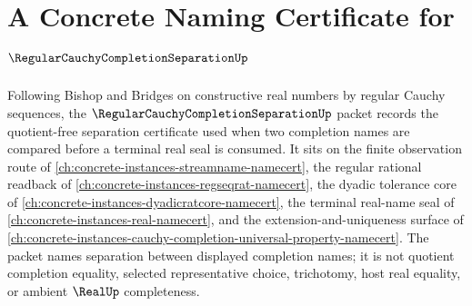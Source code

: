 \chapter{A Concrete Naming Certificate for $\RegularCauchyCompletionSeparationUp$}
\label{ch:concrete-instances-regular-cauchy-completion-separation-namecert}

Following Bishop and Bridges on constructive real numbers by regular Cauchy sequences, the $\RegularCauchyCompletionSeparationUp$ packet records the quotient-free separation certificate used when two completion names are compared before a terminal real seal is consumed. It sits on the finite observation route of \autoref{ch:concrete-instances-streamname-namecert}, the regular rational readback of \autoref{ch:concrete-instances-regseqrat-namecert}, the dyadic tolerance core of \autoref{ch:concrete-instances-dyadicratcore-namecert}, the terminal real-name seal of \autoref{ch:concrete-instances-real-namecert}, and the extension-and-uniqueness surface of \autoref{ch:concrete-instances-cauchy-completion-universal-property-namecert}. The packet names separation between displayed completion names; it is not quotient completion equality, selected representative choice, trichotomy, host real equality, or ambient $\RealUp$ completeness.

